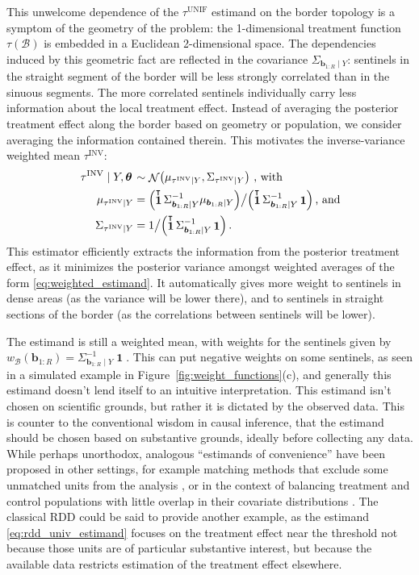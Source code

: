 \documentclass[letter]{article}
\let\originalleft\left
\let\originalright\right
\def\left#1{\mathopen{}\originalleft#1}
\def\right#1{\originalright#1\mathclose{}}
\DeclarePairedDelimiter{\parenthesis}{\lparen}{\rparen}
\newcommand{\del}[1]{\parenthesis*{#1}}
\DeclareMathOperator{\normal}{\mathcal{N}}
\DeclareMathOperator{\ones}{\mathbf{1}}
\newcommand*{\trans}{^{\mkern-1.5mu\intercal}}
\newcommand{\border}{\mathcal{B}}
\newcommand{\sentinel}{\bm{b}}
\newcommand{\numsent}{R}
\newcommand{\sentinels}{\sentinel_{1:\numsent}}
\newcommand{\unifavg}{\tau^{\mathrm{UNIF}}}
\newcommand{\invvar}{\tau^{\mathrm{INV}}}
\newcommand{\eqlabel}[1]{\label{#1}}
\newcommand{\hyperparam}{\bm{\theta}}
\newcommand{\weightb}{w_{\border}}
\begin{document}
This unwelcome dependence of the \(\unifavg\) estimand on the border topology is a symptom of the geometry of the problem: the 1-dimensional treatment function \(\tau(\border)\) is embedded in a Euclidean 2-dimensional space.
The dependencies induced by this geometric fact are reflected in the covariance \(\Sigma_{\sentinels \mid Y}\): sentinels in the straight segment of the border will be less strongly correlated than in the sinuous segments.
The more correlated sentinels individually carry less information about the local treatment effect.
Instead of averaging the posterior treatment effect along the border based on geometry or population, we consider averaging the information contained therein.
This motivates the inverse-variance weighted mean \(\invvar\):
\begin{equation}
\begin{split}
    \left. \invvar \mid Y, \hyperparam \right. &\sim \normal\del{\mu_{\invvar \mid Y}, \Sigma_{\invvar \mid Y}} ~ \text{, with} \\
    \mu_{\invvar \mid Y} &= \del{\ones\trans \Sigma_{\sentinels \mid Y}^{-1} \mu_{\sentinels \mid Y}} \big/ \del{\ones\trans \Sigma_{\sentinels \mid Y}^{-1} \ones} \,\textrm{, and} \\
    \Sigma_{\invvar \mid Y} &= 1 \big/ \del{\ones\trans \Sigma_{\sentinels \mid Y}^{-1} \ones} \,.
\end{split}
\eqlabel{eq:invvar}
\end{equation}
This estimator efficiently extracts the information from the posterior treatment effect, as it minimizes the posterior variance amongst weighted averages of the form \eqref{eq:weighted_estimand}.
It automatically gives more weight to sentinels in dense areas (as the variance will be lower there), and to sentinels in straight sections of the border (as the correlations between sentinels will be lower).

The estimand is still a weighted mean, with weights for the sentinels given by \(\weightb(\sentinels) = \Sigma_{\sentinels \mid Y}^{-1} \ones\).
This can put negative weights on some sentinels, as seen in a simulated example in Figure~\ref{fig:weight_functions}(c), and generally this estimand doesn't lend itself to an intuitive interpretation.
This estimand isn't chosen on scientific grounds, but rather it is dictated by the observed data.
This is counter to the conventional wisdom in causal inference, that the estimand should be chosen based on substantive grounds, ideally before collecting any data.
While perhaps unorthodox, analogous ``estimands of convenience'' have been proposed in other settings, for example matching methods that exclude some unmatched units from the analysis \citep[discussed in][]{crump2009dealing}, or in the context of balancing treatment and control populations with little overlap in their covariate distributions \citep{li2016balancing}.
The classical RDD could be said to provide another example, as the estimand \eqref{eq:rdd_univ_estimand} focuses on the treatment effect near the threshold not because those units are of particular substantive interest, but because the available data restricts estimation of the treatment effect elsewhere.
    
\end{document}
